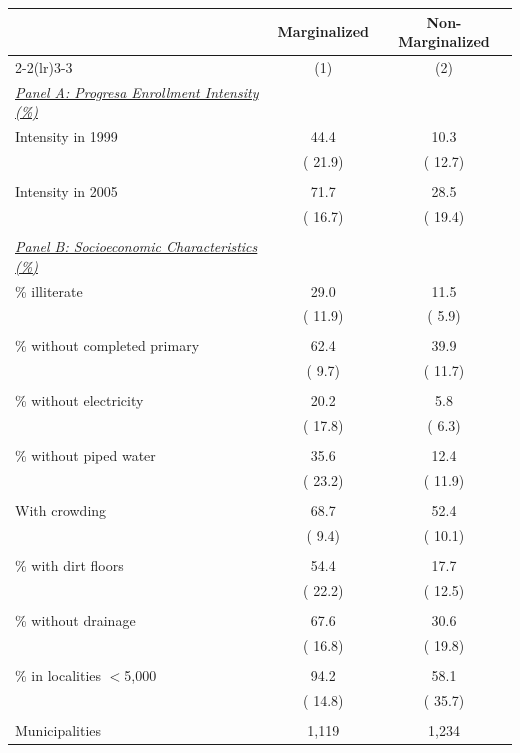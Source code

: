 \begin{tabular}{lcc} \hline \hline
& \multicolumn{1}{c}{Marginalized} & \multicolumn{1}{c}{Non-Marginalized} \\ 
\cmidrule(lr){2-2}\cmidrule(lr){3-3}
& \multicolumn{1}{c}{(1)} & \multicolumn{1}{c}{(2)} \\ \toprule
\underline{\textit{Panel A: Progresa Enrollment Intensity (\%)}} \\ 
Intensity in 1999 &   44.4 &   10.3 \\ 
  & (  21.9) & (  12.7) \\ 
  & & \\ 
Intensity in 2005 &   71.7 &   28.5 \\ 
  & (  16.7) & (  19.4) \\ 
  & & \\ 
\underline{\textit{Panel B: Socioeconomic Characteristics (\%)}} \\ 
\% illiterate &   29.0 &   11.5 \\ 
  & (  11.9) & (   5.9) \\ 
  & & \\ 
\% without completed primary &   62.4 &   39.9 \\ 
  & (   9.7) & (  11.7) \\ 
  & & \\ 
\% without electricity &   20.2 &    5.8 \\ 
  & (  17.8) & (   6.3) \\ 
  & & \\ 
\% without piped water &   35.6 &   12.4 \\ 
  & (  23.2) & (  11.9) \\ 
  & & \\ 
With crowding &   68.7 &   52.4 \\ 
  & (   9.4) & (  10.1) \\ 
  & & \\ 
\% with dirt floors &   54.4 &   17.7 \\ 
  & (  22.2) & (  12.5) \\ 
  & & \\ 
\% without drainage &   67.6 &   30.6 \\ 
  & (  16.8) & (  19.8) \\ 
  & & \\ 
\% in localities $<$5,000 &   94.2 &   58.1 \\ 
  & (  14.8) & (  35.7) \\ 
  & & \\ 
Municipalities & 1,119 & 1,234 \\ 
\bottomrule
\end{tabular}